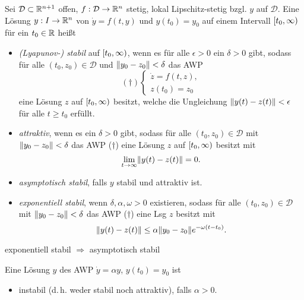 \documentclass{cheat-sheet}
\newcommand{\D}{\mathcal{D}}
\begin{document}




\begin{defn}
  Sei $\D \subset \R^{n+1}$ offen, $f : \D \to \R^n$ stetig, lokal Lipschitz-stetig bzgl. $y$ auf $\D$. Eine Lösung $y : I \to \mathbb{R}^n$ von $\dot{y} = f(t, y)$ und $y(t_0) = y_0$ auf einem Intervall $\left[ t_0, \infty \right)$ für ein $t_0 \in \mathbb{R}$ heißt
  \begin{itemize}
    \item \emph{(Lyapunov-) stabil} auf $\left[ t_0, \infty \right)$, wenn es für alle $\epsilon > 0$ ein $\delta > 0$ gibt, sodass für alle $(t_0, z_0) \in \D$ und $\lVert y_0 - z_0\rVert < \delta$ das AWP
    \[
      (\dagger) \left\{ \begin{array}{ll}
        \dot{z} = f(t, z),\\
        z(t_0) = z_0
      \end{array} \right.
    \]
    eine Lösung $z$ auf $\left[ t_0, \infty \right)$ besitzt, welche die Ungleichung $\lVert y(t) - z(t)\rVert < \epsilon$ für alle $t \geq t_0$ erfüllt.
    \item \emph{attraktiv}, wenn es ein $\delta > 0$ gibt, sodass für alle $(t_0, z_0) \in \D$ mit $\lVert y_0 - z_0\rVert < \delta$ das AWP ($\dagger$) eine Lösung $z$ auf $\left[ t_0, \infty \right)$ besitzt mit
    \[ \lim_{t \to \infty} \lVert y(t) - z(t)\rVert = 0. \]
    \item \emph{asymptotisch stabil}, falls $y$ stabil und attraktiv ist.
    \item \emph{exponentiell stabil}, wenn $\delta, \alpha, \omega > 0$ existieren, sodass für alle $(t_0, z_0) \in \D$ mit $\lVert y_0 - z_0\rVert < \delta$ das AWP ($\dagger$) eine Lsg $z$ besitzt mit
    \[ \lVert y(t) - z(t)\rVert \leq \alpha \lVert y_0 - z_0\rVert e^{-\omega (t-t_0)}. \]
  \end{itemize}
\end{defn}

\begin{bem}
  exponentiell stabil $\Rightarrow$ asymptotisch stabil
\end{bem}

\begin{bsp}
  Eine Lösung $y$ des AWP $\dot{y} = \alpha y$, $y(t_0) = y_0$ ist
  \begin{itemize}
    \item instabil (d.\,h. weder stabil noch attraktiv), falls $\alpha > 0$.
  \end{itemize}
\end{bsp}
\end{document}
